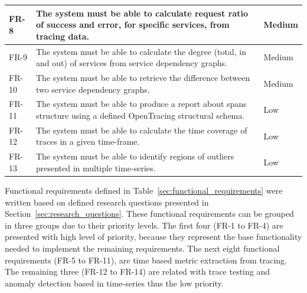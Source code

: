 \begin{table}[H]
\begin{tabularx}{\linewidth} {
        |>{\hsize=0.10\hsize}X|
        >{\hsize=0.75\hsize}X|
        >{\hsize=0.15\hsize}X|}
        FR-8
         & The system must be able to calculate request ratio of success and error, for specific services, from tracing data.
         & Medium                                                                                                               \\ \hline
        FR-9
         & The system must be able to calculate the degree (total, in and out) of services from service dependency graphs.
         & Medium                                                                                                               \\ \hline
        FR-10
         & The system must be able to retrieve the difference between two service dependency graphs.
         & Medium                                                                                                               \\ \hline
        FR-11
         & The system must be able to produce a report about spans structure using a defined OpenTracing structural schema.
         & Low                                                                                                                  \\ \hline
        FR-12
         & The system must be able to calculate the time coverage of traces in a given time-frame.
         & Low                                                                                                                  \\ \hline
        FR-13
         & The system must be able to identify regions of outliers presented in multiple time-series.
         & Low                                                                                                                  \\ \hline
    \end{tabularx}
\end{table}

Functional requirements defined in Table~\ref{sec:functional_requirements} were written based on defined research questions presented in Section~\ref{sec:research_questions}. These functional requirements can be grouped in three groups due to their priority levels. The first four (FR-1 to FR-4) are presented with high level of priority, because they represent the base functionality needed to implement the remaining requirements. The next eight functional requirements (FR-5 to FR-11), are time based metric extraction from tracing. The remaining three (FR-12 to FR-14) are related with trace testing and anomaly detection based in time-series thus the low priority.

